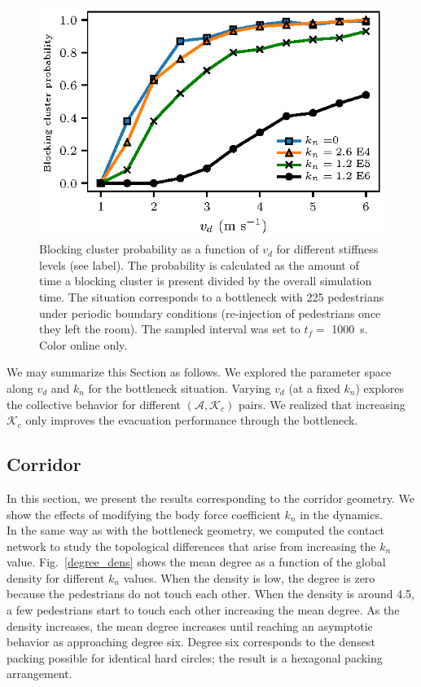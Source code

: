 \documentclass[preprint,12pt]{elsarticle}
\begin{document}
\begin{figure}[htbp!]
\centering
\includegraphics[width=0.7\columnwidth]
{./pbc_vs_vd_multi_kn.eps}
\caption{\label{pbc_vs_vd_multi_kn} Blocking cluster probability as a function of $v_d$ for different stiffness levels (see label). The probability is calculated as the amount of time a blocking cluster is present divided by the overall simulation time. The situation corresponds to a bottleneck with 225 pedestrians under periodic boundary conditions (re-injection of pedestrians once they left the room). The sampled interval was set to $t_f =$ 1000~s. Color online only. }
\end{figure}

We may summarize this Section as follows. We explored the parameter space along $v_d$ and $k_n$ for the bottleneck situation. Varying $v_d$ (at a fixed $k_n$) explores the collective behavior for different $(\mathcal{A},\mathcal{K}_c)$ pairs. We realized that increasing $\mathcal{K}_c$ only improves the evacuation performance through the bottleneck. 



\subsection{\label{corridor} Corridor}

In this section, we present the results corresponding to the corridor geometry. We show the effects of modifying the body force coefficient $k_n$ in the dynamics.\\

In the same way as with the bottleneck geometry, we computed the contact network to study the topological differences that arise from increasing the $k_n$ value. Fig.~\ref{degree_dens} shows the mean degree as a function of the global density for different $k_n$ values. When the density is low,  the degree is zero because the pedestrians do not touch each other. When the density is around 4.5, a few pedestrians start to touch each other increasing the mean degree. As the density increases, the mean degree increases until reaching an asymptotic behavior as approaching degree six. Degree six corresponds to the densest packing possible for identical hard circles; the result is a hexagonal packing arrangement.\\
\end{document}
